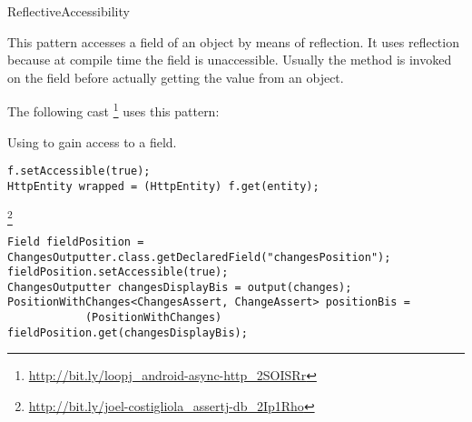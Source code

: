 
\begin{pattern}{ReflectiveAccessibility}

This pattern accesses a field of an object by means of reflection.
It uses reflection because at compile time the field is unaccessible.
Usually the method  is invoked on the field
before actually getting the value from an object.

\instances{}
The following cast%
\footnote{\url{http://bit.ly/loopj_android-async-http_2SOISRr}}
uses this pattern:

\begin{listing}
\caption{Using  to gain access to a field.}
\begin{verbatim}
f.setAccessible(true);
HttpEntity wrapped = (HttpEntity) f.get(entity);
\end{verbatim}
\end{listing}

\footnote{\url{http://bit.ly/joel-costigliola_assertj-db_2Ip1Rho}}

\begin{verbatim}
Field fieldPosition = ChangesOutputter.class.getDeclaredField("changesPosition");
fieldPosition.setAccessible(true);
ChangesOutputter changesDisplayBis = output(changes);
PositionWithChanges<ChangesAssert, ChangeAssert> positionBis = 
            (PositionWithChanges) fieldPosition.get(changesDisplayBis);
\end{verbatim}



\end{pattern}
